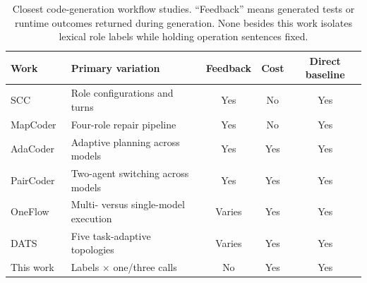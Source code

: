 \begin{table}[t]
\caption{Closest code-generation workflow studies. ``Feedback'' means generated tests or runtime outcomes returned during generation. None besides this work isolates lexical role labels while holding operation sentences fixed.}
\label{tab:related-designs}
\centering\scriptsize
\begin{tabularx}{\linewidth}{@{}lXccc@{}}
\toprule
Work & Primary variation & Feedback & Cost & Direct baseline\\
\midrule
SCC~\cite{dong2023selfcollaboration} & Role configurations and turns & Yes & No & Yes\\
MapCoder~\cite{islam2024mapcoder} & Four-role repair pipeline & Yes & No & Yes\\
AdaCoder~\cite{zhu2026adacoder} & Adaptive planning across models & Yes & Yes & Yes\\
PairCoder~\cite{chen2026paircoder} & Two-agent switching across models & Yes & Yes & Yes\\
OneFlow~\cite{xu2026oneflow} & Multi- versus single-model execution & Varies & Yes & Yes\\
DATS~\cite{hong2026dats} & Five task-adaptive topologies & Varies & Yes & Yes\\
This work & Labels $\times$ one/three calls & No & Yes & Yes\\
\bottomrule
\end{tabularx}
\end{table}

